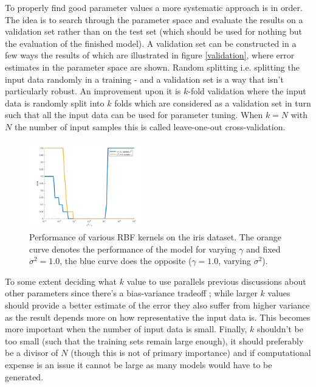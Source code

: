 \par To properly find good parameter values a more systematic approach is in order. The idea is to search through the parameter space and evaluate the results on a validation set rather than on the test set (which should be used for nothing but the evaluation of the finished model). A validation set can be constructed in a few ways the results of which are illustrated in figure \ref{validation}, where error estimates in the parameter space are shown. Random splitting i.e. splitting the input data randomly in a training - and a validation set is a way that isn't particularly robust. An improvement upon it is $k$-fold validation where the input data is randomly split into $k$ folds which are considered as a validation set in turn such that all the input data can be used for parameter tuning. When $k=N$ with $N$ the number of input samples this is called leave-one-out cross-validation. 

\begingroup
\setlength{\columnsep}{0.75cm}
\setlength{\intextsep}{0.2cm}
\begin{figure}
\centering
\includegraphics[width=0.45\textwidth]{../src/figures/iris/tuning}
\caption{Performance of various RBF kernels on the iris dataset. The orange curve denotes the performance of the model for varying $\gamma$ and fixed $\sigma^2=1.0$, the blue curve does the opposite ($\gamma=1.0$, varying $\sigma^2$).}
\label{iris2}
\end{figure}

\par To some extent deciding what $k$ value to use parallels previous discussions about other parameters since there's a bias-variance tradeoff ; while larger $k$ values should provide a better estimate of the error they also suffer from higher variance as the result depends more on how representative the input data is. This becomes more important when the number of input data is small. Finally, $k$ shouldn't be too small (such that the training sets remain large enough), it should preferably be a divisor of $N$ (though this is not of primary importance) and if computational expense is an issue it cannot be large as many models would have to be generated.

